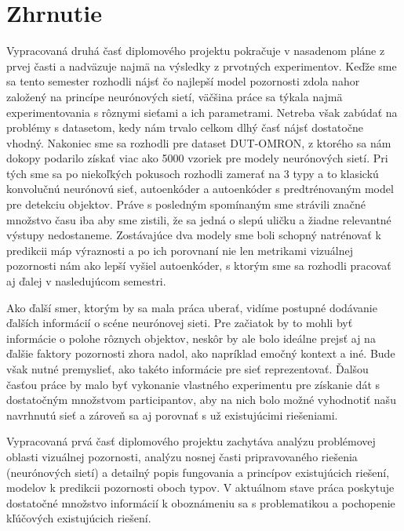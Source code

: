 
\newpage
\section{Zhrnutie}

Vypracovaná druhá časť diplomového projektu pokračuje v nasadenom pláne z prvej časti a nadväzuje najmä na výsledky z prvotných experimentov. Keďže sme sa tento semester rozhodli nájsť čo najlepší model pozornosti zdola nahor založený na princípe neurónových sietí, väčšina práce sa týkala najmä experimentovania s rôznymi sieťami a ich parametrami. Netreba však zabúdať na problémy s datasetom, kedy nám trvalo celkom dlhý časť nájsť dostatočne vhodný. Nakoniec sme sa rozhodli pre dataset DUT-OMRON, z ktorého sa nám dokopy podarilo získať viac ako 5000 vzoriek pre modely neurónových sietí. Pri tých sme sa po niekoľkých pokusoch rozhodli zamerať na 3 typy a to klasickú konvolučnú neurónovú sieť, autoenkóder a autoenkóder s predtrénovaným model pre detekciu objektov. Práve s posledným spomínaným sme strávili značné množstvo času iba aby sme zistili, že sa jedná o slepú uličku a žiadne relevantné výstupy nedostaneme. Zostávajúce dva modely sme boli schopný natrénovať k predikcii máp výraznosti a po ich porovnaní nie len metrikami vizuálnej pozornosti nám ako lepší vyšiel autoenkóder, s ktorým sme sa rozhodli pracovať aj ďalej v nasledujúcom semestri.

Ako ďalší smer, ktorým by sa mala práca uberať, vidíme postupné dodávanie ďalších informácií o scéne neurónovej sieti. Pre začiatok by to mohli byť informácie o polohe rôznych objektov, neskôr by ale bolo ideálne prejsť aj na ďalšie faktory pozornosti zhora nadol, ako napríklad emočný kontext a iné. Bude však nutné premyslieť, ako takéto informácie pre sieť reprezentovať. Ďalšou časťou práce by malo byť vykonanie vlastného experimentu pre získanie dát s dostatočným množstvom participantov, aby na nich bolo možné vyhodnotiť našu navrhnutú sieť a zároveň sa aj porovnať s už existujúcimi riešeniami. 

\iffalse
Vypracovaná prvá časť diplomového projektu zachytáva analýzu problémovej oblasti vizuálnej pozornosti, analýzu nosnej časti pripravovaného riešenia (neurónových sietí) a detailný popis fungovania a princípov existujúcich riešení, modelov k predikcii pozornosti oboch typov. V aktuálnom stave práca poskytuje dostatočné množstvo informácií k oboznámeniu sa s problematikou a pochopenie kľúčových existujúcich riešení. 

